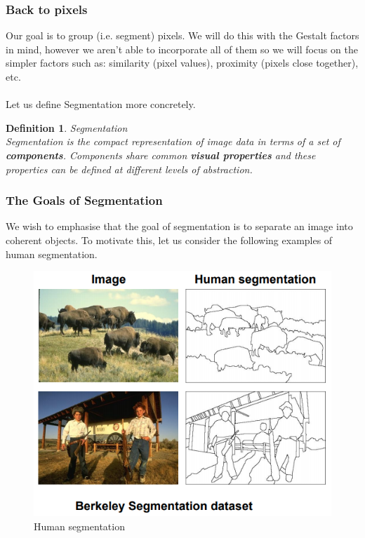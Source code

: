 \documentclass{article}
\newtheorem{definition}{Definition}[subsection]
\begin{document}
\subsubsection{Back to pixels}
Our goal is to group (i.e. segment) pixels. We will do this with the Gestalt factors in mind, however we aren't able to incorporate all of them so we will focus on the simpler factors such as: similarity (pixel values), proximity (pixels close together), etc.
\\\\
Let us define Segmentation more concretely.
\begin{definition}{Segmentation}
\\
Segmentation is the compact representation of image data in terms of a set of \textbf{components}. Components share common \textbf{visual properties} and these properties can be defined at different levels of abstraction.
\end{definition}

\subsubsection{The Goals of Segmentation}
We wish to emphasise that the goal of segmentation is to separate an image into coherent objects. To motivate this, let us consider the following examples of human segmentation.

\begin{figure}[htp]
    \centering
    \includegraphics[width=12cm]{slide_10_1}
    \caption{Human segmentation}
    \label{fig:Slide10_1}
\end{figure}
\end{document}
